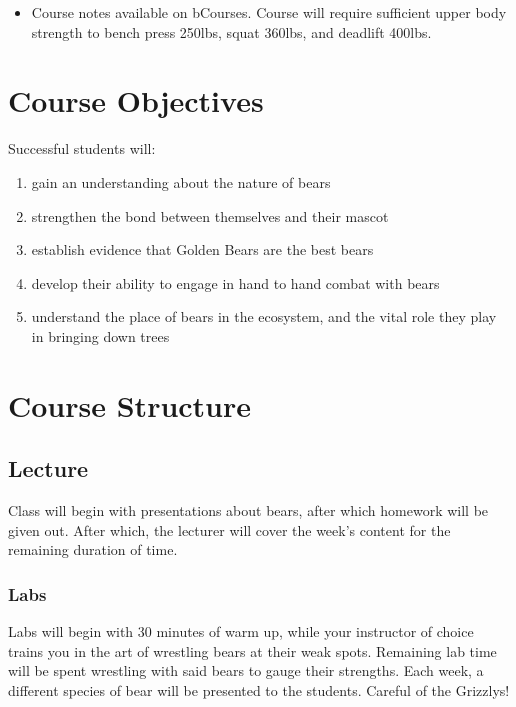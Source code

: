 \documentclass[11pt]{article}
\begin{document}
\begin{itemize}
\item Course notes available on bCourses. Course will require sufficient upper body strength to bench press 250lbs, squat 360lbs, and deadlift 400lbs. 
\end{itemize}



\section*{Course Objectives}
Successful students will:
\begin{enumerate}
\item gain an understanding about the nature of bears 
\item strengthen the bond between themselves and their mascot
\item establish evidence that Golden Bears are the best bears
\item develop their ability to engage in hand to hand combat with bears
\item understand the place of bears in the ecosystem, and the vital role they play in bringing down trees 
\end{enumerate}


\section*{Course Structure}

\subsection*{Lecture}

Class will begin with presentations about bears, after which homework will be given out. After which, the lecturer will cover the week's content for the remaining duration of time. 

\subsubsection*{Labs}

Labs will begin with 30 minutes of warm up, while your instructor of choice trains you in the art of wrestling bears at their weak spots. Remaining lab time will be spent wrestling with said bears to gauge their strengths. Each week, a different species of bear will be presented to the students. Careful of the Grizzlys! 
\end{document}
